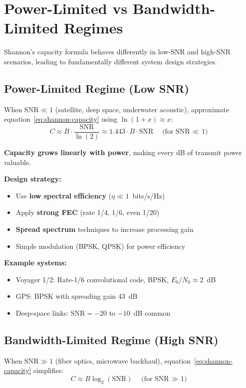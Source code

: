 \section{Power-Limited vs Bandwidth-Limited Regimes}

Shannon's capacity formula behaves differently in low-SNR and high-SNR scenarios, leading to fundamentally different system design strategies.

\subsection{Power-Limited Regime (Low SNR)}

When $\mathrm{SNR} \ll 1$ (satellite, deep space, underwater acoustic), approximate equation~\eqref{eq:shannon-capacity} using $\ln(1+x) \approx x$:
\begin{equation}
C \approx B \cdot \frac{\mathrm{SNR}}{\ln(2)} \approx 1.443 \cdot B \cdot \mathrm{SNR} \quad \text{(for SNR $\ll$ 1)}
\label{eq:power-limited}
\end{equation}

\textbf{Capacity grows linearly with power}, making every dB of transmit power valuable.

\textbf{Design strategy:}
\begin{itemize}
\item Use \textbf{low spectral efficiency} ($\eta \ll 1$~bits/s/Hz)
\item Apply \textbf{strong FEC} (rate 1/4, 1/6, even 1/20)
\item \textbf{Spread spectrum} techniques to increase processing gain
\item Simple modulation (BPSK, QPSK) for power efficiency
\end{itemize}

\textbf{Example systems:}
\begin{itemize}
\item Voyager 1/2: Rate-1/6 convolutional code, BPSK, $E_b/N_0 \approx 2$~dB
\item GPS: BPSK with spreading gain 43~dB
\item Deep-space links: $\mathrm{SNR} = -20$ to $-10$~dB common
\end{itemize}

\subsection{Bandwidth-Limited Regime (High SNR)}

When $\mathrm{SNR} \gg 1$ (fiber optics, microwave backhaul), equation~\eqref{eq:shannon-capacity} simplifies:
\begin{equation}
C \approx B \log_2(\mathrm{SNR}) \quad \text{(for SNR $\gg$ 1)}
\label{eq:bandwidth-limited}
\end{equation}

